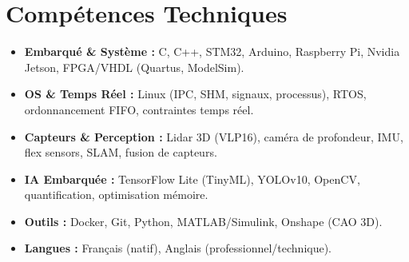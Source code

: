 \documentclass[a4paper,11pt]{article}
\begin{document}
\section{Compétences Techniques}
\begin{itemize}[leftmargin=*, nosep]
    \item \small{\textbf{Embarqué \& Système :} C, C++, STM32, Arduino, Raspberry Pi, Nvidia Jetson, FPGA/VHDL (Quartus, ModelSim).}
    \item \small{\textbf{OS \& Temps Réel :} Linux (IPC, SHM, signaux, processus), RTOS, ordonnancement FIFO, contraintes temps réel.}
    \item \small{\textbf{Capteurs \& Perception :} Lidar 3D (VLP16), caméra de profondeur, IMU, flex sensors, SLAM, fusion de capteurs.}
    \item \small{\textbf{IA Embarquée :} TensorFlow Lite (TinyML), YOLOv10, OpenCV, quantification, optimisation mémoire.}
    \item \small{\textbf{Outils :} Docker, Git, Python, MATLAB/Simulink, Onshape (CAO 3D).}
    \item \small{\textbf{Langues :} Français (natif), Anglais (professionnel/technique).}
\end{itemize}

\end{document}

